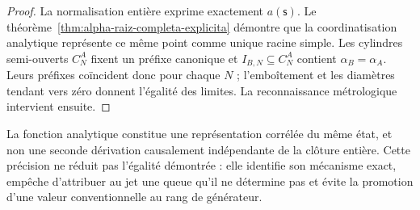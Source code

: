 \begin{proof}
La normalisation entière exprime exactement \(a(\mathsf s)\). Le
théorème~\ref{thm:alpha-raiz-completa-explicita} démontre que la coordinatisation
analytique représente ce même point comme unique racine simple. Les
cylindres semi-ouverts \(C_N^A\) fixent un préfixe canonique et
\(I_{B,N}\subseteq C_N^A\) contient \(\alpha_B=\alpha_A\). Leurs
préfixes coïncident donc pour chaque \(N\) ; l'emboîtement et les diamètres tendant vers
zéro donnent l'égalité des limites. La reconnaissance
métrologique intervient ensuite.
\end{proof}

La fonction analytique constitue une représentation corrélée du même
état, et non une seconde dérivation causalement indépendante de la clôture
entière. Cette précision ne réduit pas l’égalité démontrée : elle identifie son
mécanisme exact, empêche d’attribuer au jet une queue qu’il ne détermine pas et évite la
promotion d’une valeur conventionnelle au rang de générateur.
